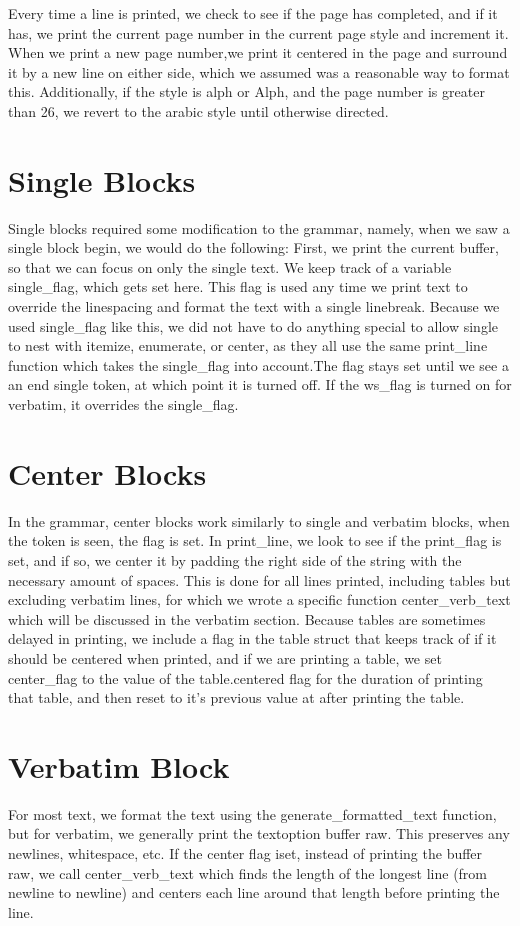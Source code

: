 Every time a line is printed, we check to see if the page has completed, and if it has, we print the current page number in the current page style and increment it. When we print a new page number,we print it centered in the page and surround it by a new line on either side, which we assumed was a reasonable way to format this. Additionally, if the style is alph or Alph, and the page number is greater than 26, we revert to the arabic style until otherwise directed.

\section{Single Blocks}
Single blocks required some modification to the grammar, namely, when we saw a single block begin, we would do the following: First, we print the current buffer, so that we can focus on only the single text. We keep track of a variable single_flag, which gets set here. This flag is used any time we print text to override the linespacing and format the text with a single linebreak. Because we used single_flag like this, we did not have to do anything special to allow single to nest with itemize, enumerate, or center, as they all use the same print_line function which takes the single_flag into account.The flag stays set until we see a an end single token, at which point it is turned off. If the ws_flag is turned on for verbatim, it overrides the single_flag. 

\section{Center Blocks}
In the grammar, center blocks work similarly to single and verbatim blocks, when the token is seen, the flag is set. In print_line, we look to see if the print_flag is set, and if so, we center it by padding the right side of the string with the necessary amount of spaces. This is done for all lines printed, including tables but excluding verbatim lines, for which we wrote a specific function center_verb_text which will be discussed in the verbatim section. Because tables are sometimes delayed in printing, we include a flag in the table struct that keeps track of if it should be centered when printed, and if we are printing a table, we set center_flag to the value of the table.centered flag for the duration of printing that table, and then reset to it's previous value at after printing the table.

\section{Verbatim Block}
For most text, we format the text using the generate_formatted_text function, but for verbatim, we generally print the textoption buffer raw. This preserves any newlines, whitespace, etc. If the center flag iset, instead of printing the buffer raw, we call center_verb_text which finds the length of the longest line (from newline to newline) and centers each line around that length before printing the line.



